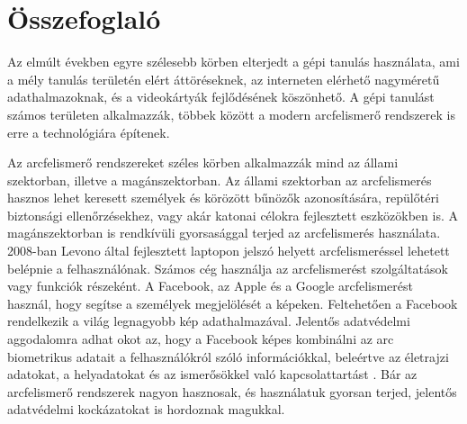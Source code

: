 \section{Összefoglaló}




Az elmúlt években egyre szélesebb körben elterjedt a gépi tanulás használata, ami a mély tanulás területén elért áttöréseknek, az interneten elérhető nagyméretű adathalmazoknak, és a videokártyák fejlődésének köszönhető. A gépi tanulást számos területen alkalmazzák, többek között a modern arcfelismerő rendszerek is erre a technológiára építenek. 

Az arcfelismerő rendszereket széles körben alkalmazzák mind az állami szektorban, illetve a magánszektorban. Az állami szektorban az arcfelismerés hasznos lehet keresett személyek és körözött bűnözők azonosítására, repülőtéri biztonsági ellenőrzésekhez, vagy akár katonai célokra fejlesztett eszközökben is. A magánszektorban is rendkívüli gyorsasággal terjed az arcfelismerés használata. 2008-ban Levono által fejlesztett laptopon jelszó helyett arcfelismeréssel lehetett belépnie a felhasználónak. Számos cég használja az arcfelismerést szolgáltatások vagy funkciók részeként. A Facebook, az Apple és a Google arcfelismerést használ, hogy segítse a személyek megjelölését a képeken. Feltehetően a Facebook rendelkezik a világ legnagyobb kép adathalmazával. Jelentős adatvédelmi aggodalomra adhat okot az, hogy a Facebook képes kombinálni az arc biometrikus adatait a felhasználókról szóló információkkal, beleértve az életrajzi adatokat, a helyadatokat és az ismerősökkel való kapcsolattartást \cite{public_private_fr}. Bár az arcfelismerő rendszerek nagyon hasznosak, és használatuk gyorsan terjed, jelentős adatvédelmi kockázatokat is hordoznak magukkal. 

